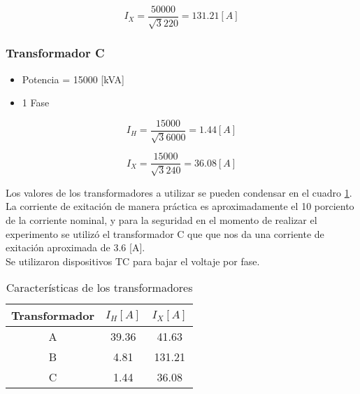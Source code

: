 \documentclass[]{article}
\begin{document}
		
		\begin{equation}
		I_X=\frac{50000}{\sqrt{3}220}=131.21[A]
		\end{equation}
	
	
	
	\subsubsection{Transformador C}
	
		\begin{itemize}
			\item Potencia = 15000 [kVA]
			\item 1 Fase
		\end{itemize}
		
		\begin{equation}
		I_H=\frac{15000}{\sqrt{3}6000}=1.44[A]
		\end{equation}
		
		
		\begin{equation}
		I_X=\frac{15000}{\sqrt{3}240}=36.08[A]
		\end{equation}
		
		Los valores de los transformadores a utilizar se pueden condensar en el cuadro \ref{transformadores}.\\
		
		La corriente de exitación de manera práctica es aproximadamente el 10 porciento de la corriente nominal, y para la seguridad en el momento de realizar el experimento se utilizó el transformador C que que nos da una corriente de exitación aproximada de 3.6 [A].\\
		
		Se utilizaron dispositivos TC para bajar el voltaje por fase.\\
		
		\begin{table}[h!]
			\centering
			\begin{tabular}{|c|c|c|}
				\hline
				Transformador & $I_H [A]$ & $I_X [A]$ \\ \hline
				A             & 39.36      & 41.63      \\ \hline
				B             & 4.81       & 131.21     \\ \hline
				C             & 1.44       & 36.08      \\ \hline
			\end{tabular}
			\caption{Características de los transformadores}
			\label{transformadores}
		\end{table}
	
\end{document}
